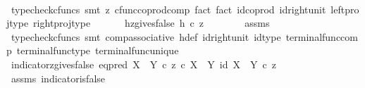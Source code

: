 \begin{isabellebody}
\ \ \ \ \ \ \isamarkupfalse%
\ {\isacharparenleft}{\kern0pt}typecheck{\isacharunderscore}{\kern0pt}cfuncs{\isacharcomma}{\kern0pt}\ smt\ {\isacharparenleft}{\kern0pt}z{}{\isacharparenright}{\kern0pt}\ cfunc{\isacharunderscore}{\kern0pt}coprod{\isacharunderscore}{\kern0pt}comp\ fact{}\ fact{}\ id{\isacharunderscore}{\kern0pt}coprod\ id{\isacharunderscore}{\kern0pt}right{\isacharunderscore}{\kern0pt}unit{}\ left{\isacharunderscore}{\kern0pt}proj{\isacharunderscore}{\kern0pt}type\ right{\isacharunderscore}{\kern0pt}proj{\isacharunderscore}{\kern0pt}type{\isacharparenright}{\kern0pt}\isanewline
\ \ \isamarkupfalse%
\isanewline
\ \ \isamarkupfalse%
\ hz{\isacharunderscore}{\kern0pt}gives{\isacharunderscore}{\kern0pt}false{\isacharcolon}{\kern0pt}\ {\isachardoublequoteopen}h\ {\isasymcirc}\isactrlsub c\ z\ {\isacharequal}{\kern0pt}\ {\isasymf}{\isachardoublequoteclose}\isanewline
\ \ \ \ \isamarkupfalse%
\ assms\ \isamarkupfalse%
\ {\isacharparenleft}{\kern0pt}typecheck{\isacharunderscore}{\kern0pt}cfuncs{\isacharcomma}{\kern0pt}\ smt\ comp{\isacharunderscore}{\kern0pt}associative{}\ h{\isacharunderscore}{\kern0pt}def\ id{\isacharunderscore}{\kern0pt}right{\isacharunderscore}{\kern0pt}unit{}\ id{\isacharunderscore}{\kern0pt}type\ terminal{\isacharunderscore}{\kern0pt}func{\isacharunderscore}{\kern0pt}comp\ terminal{\isacharunderscore}{\kern0pt}func{\isacharunderscore}{\kern0pt}type\ terminal{\isacharunderscore}{\kern0pt}func{\isacharunderscore}{\kern0pt}unique{\isacharparenright}{\kern0pt}\isanewline
\ \ \isamarkupfalse%
\ \isamarkupfalse%
\ indicator{\isacharunderscore}{\kern0pt}z{\isacharunderscore}{\kern0pt}gives{\isacharunderscore}{\kern0pt}false{\isacharcolon}{\kern0pt}\ {\isachardoublequoteopen}{\isacharparenleft}{\kern0pt}eq{\isacharunderscore}{\kern0pt}pred\ {\isacharparenleft}{\kern0pt}X\ {\isasymCoprod}\ Y{\isacharparenright}{\kern0pt}\ {\isasymcirc}\isactrlsub c\ {\isasymlangle}z\ {\isasymcirc}\isactrlsub c\ {\isasymbeta}\isactrlbsub X\ {\isasymCoprod}\ Y\isactrlesub {\isacharcomma}{\kern0pt}\ id\ {\isacharparenleft}{\kern0pt}X\ {\isasymCoprod}\ Y{\isacharparenright}{\kern0pt}{\isasymrangle}{\isacharparenright}{\kern0pt}\ {\isasymcirc}\isactrlsub c\ z\ {\isacharequal}{\kern0pt}\ {\isasymf}{\isachardoublequoteclose}\isanewline
\ \ \ \ \isamarkupfalse%
\ assms\ indicator{\isacharunderscore}{\kern0pt}is{\isacharunderscore}{\kern0pt}false\ \ \isamarkupfalse%

\end{isabellebody}
